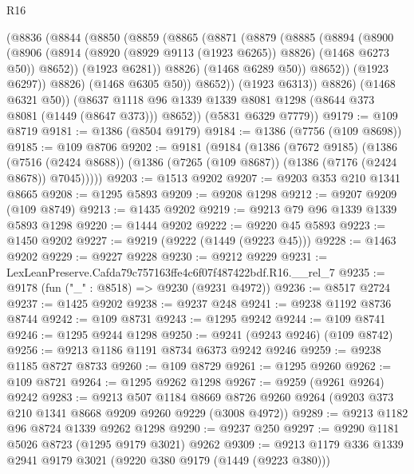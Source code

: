 \begin{lexlean}{R16}
\begin{coremodule}
                (@8836
                  (@8844
                    (@8850
                      (@8859
                        (@8865
                          (@8871
                            (@8879
                              (@8885
                                (@8894
                                  (@8900
                                    (@8906
                                      (@8914
                                        (@8920 (@8929 @9113 (@1923 @6265)) @8826)
                                        (@1468 @6273 @50))
                                      @8652))
                                  (@1923 @6281))
                                @8826)
                              (@1468 @6289 @50))
                            @8652))
                        (@1923 @6297))
                      @8826)
                    (@1468 @6305 @50))
                  @8652))
              (@1923 @6313))
            @8826)
          (@1468 @6321 @50))
        (@8637 @1118 @96 @1339 @1339 @8081 @1298 (@8644 @373 @8081 (@1449 (@8647 @373))) @8652))
      (@5831 @6329 @7779))
@9179 := @109 @8719
@9181 := @1386 (@8504 @9179)
@9184 := @1386 (@7756 (@109 @8698))
@9185 := @109 @8706
@9202 := @9181
    (@9184
      (@1386
        (@7672 @9185)
        (@1386
          (@7516 (@2424 @8688))
          (@1386 (@7265 (@109 @8687)) (@1386 (@7176 (@2424 @8678)) @7045)))))
@9203 := @1513 @9202
@9207 := @9203 @353 @210 @1341 @8665
@9208 := @1295 @5893
@9209 := @9208 @1298
@9212 := @9207 @9209 (@109 @8749)
@9213 := @1435 @9202
@9219 := @9213 @79 @96 @1339 @1339 @5893 @1298
@9220 := @1444 @9202
@9222 := @9220 @45 @5893
@9223 := @1450 @9202
@9227 := @9219 (@9222 (@1449 (@9223 @45)))
@9228 := @1463 @9202
@9229 := @9227 @9228
@9230 := @9212 @9229
@9231 := LexLeanPreserve.Cafda79c757163ffe4c6f07f487422bdf.R16.__rel_7
@9235 := @9178 (fun ("_" : @8518) => @9230 (@9231 @4972))
@9236 := @8517 @2724
@9237 := @1425 @9202
@9238 := @9237 @248
@9241 := @9238 @1192 @8736 @8744
@9242 := @109 @8731
@9243 := @1295 @9242
@9244 := @109 @8741
@9246 := @1295 @9244 @1298
@9250 := @9241 (@9243 @9246) (@109 @8742)
@9256 := @9213 @1186 @1191 @8734 @6373 @9242 @9246
@9259 := @9238 @1185 @8727 @8733
@9260 := @109 @8729
@9261 := @1295 @9260
@9262 := @109 @8721
@9264 := @1295 @9262 @1298
@9267 := @9259 (@9261 @9264) @9242
@9283 := @9213
    @507
    @1184
    @8669
    @8726
    @9260
    @9264
    (@9203 @373 @210 @1341 @8668 @9209 @9260 @9229 (@3008 @4972))
@9289 := @9213 @1182 @96 @8724 @1339 @9262 @1298
@9290 := @9237 @250
@9297 := @9290 @1181 @5026 @8723 (@1295 @9179 @3021) @9262
@9309 := @9213 @1179 @336 @1339 @2941 @9179 @3021 (@9220 @380 @9179 (@1449 (@9223 @380)))

\end{coremodule}
\end{lexlean}
